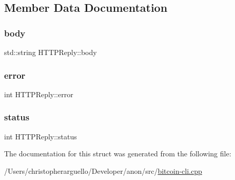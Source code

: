 \subsection{Member Data Documentation}
\mbox{\label{struct_h_t_t_p_reply_a5ee749be5b0bfcbf30b3983d67426c72}} 
\subsubsection{\texorpdfstring{body}{body}}
{\footnotesize\ttfamily std\+::string H\+T\+T\+P\+Reply\+::body}

\mbox{\label{struct_h_t_t_p_reply_af10328deec9dd5b65a5c9953159448ce}} 
\subsubsection{\texorpdfstring{error}{error}}
{\footnotesize\ttfamily int H\+T\+T\+P\+Reply\+::error}

\mbox{\label{struct_h_t_t_p_reply_a2aabf3d54afbcf87fa91542fd9024838}} 
\subsubsection{\texorpdfstring{status}{status}}
{\footnotesize\ttfamily int H\+T\+T\+P\+Reply\+::status}



The documentation for this struct was generated from the following file\+:\begin{DoxyCompactItemize}
\item 
/\+Users/christopherarguello/\+Developer/anon/src/\mbox{\hyperlink{bitcoin-cli_8cpp}{bitcoin-\/cli.\+cpp}}\end{DoxyCompactItemize}
